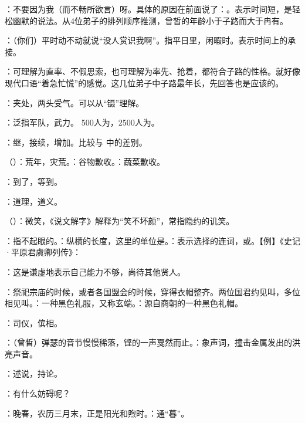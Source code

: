 {
\item {}：不要因为我（而不畅所欲言）呀。具体的原因在前面说了：。表示时间短，是轻松幽默的说法。从4位弟子的排列顺序推测，曾皙的年龄小于子路而大于冉有。
\item {}：（你们）平时动不动就说“没人赏识我啊”。指平日里，闲暇时。表示时间上的承接。
\item {}：可理解为直率、不假思索，也可理解为率先、抢着，都符合子路的性格。就好像现代口语“着急忙慌”的感觉。这几位弟子中子路最年长，先回答也是应该的。%
\item {}：夹处，两头受气。可以从“镊”理解。
\item {}：泛指军队，武力。 500人为，2500人为。
\item {}：继，接续，增加。比较与  中的差别。
\item {}（）：荒年，灾荒。：谷物歉收。：蔬菜歉收。
\item {}：到了，等到。
\item {}：道理，道义。
\item {}（）：微笑，《说文解字》解释为“笑不坏颜”，常指隐约的讥笑。
\item {}：指不起眼的。：纵横的长度，这里的单位是。：表示选择的连词，或。【例】《史记·平原君虞卿列传》：
\item {}：这是谦虚地表示自己能力不够，尚待其他贤人。
\item {}：祭祀宗庙的时候，或者各国盟会的时候，穿得衣帽整齐。两位国君约见叫，多位相见叫。：一种黑色礼服，又称玄端。：源自商朝的一种黑色礼帽。
\item {}：司仪，傧相。
\item {}：（曾皙）弹瑟的音节慢慢稀落，铿的一声戛然而止。：象声词，撞击金属发出的洪亮声音。
\item {}：述说，持论。
\item {}：有什么妨碍呢？
\item {}：晚春，农历三月末，正是阳光和煦时。：通“暮”。

}
